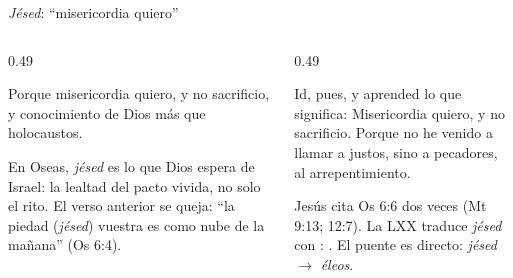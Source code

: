 \begin{frame}{\emph{Jésed}: ``misericordia quiero''}
\begin{columns}[t,onlytextwidth]
\begin{column}{0.49\textwidth}
\begin{cita}Porque misericordia quiero, y no sacrificio, y conocimiento de Dios más que holocaustos.\end{cita}
\begin{center}\end{center}
\scriptsize En Oseas, \emph{jésed} es lo que Dios espera de Israel: la lealtad del pacto vivida, no solo el rito. El verso anterior se queja: ``la piedad (\emph{jésed}) vuestra es como nube de la mañana'' (Os 6:4).
\end{column}
\begin{column}{0.49\textwidth}
\begin{cita}Id, pues, y aprended lo que significa: Misericordia quiero, y no sacrificio. Porque no he venido a llamar a justos, sino a pecadores, al arrepentimiento.\end{cita}
\scriptsize Jesús cita Os 6:6 dos veces (Mt 9:13; 12:7). La LXX traduce \emph{jésed} con : . El puente es directo: \emph{jésed} $\rightarrow$ \emph{éleos}.
\end{column}
\end{columns}
\end{frame}

